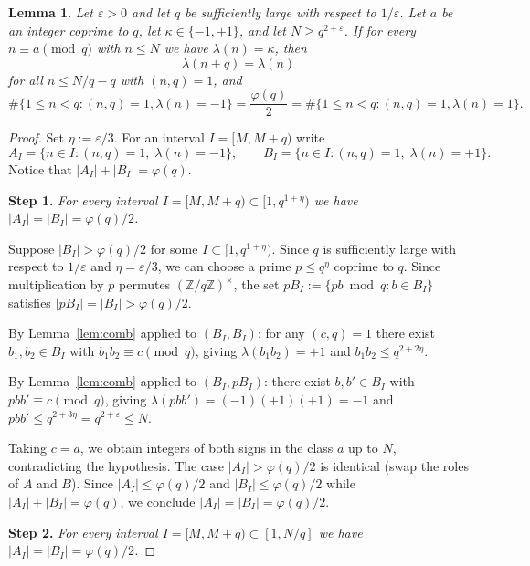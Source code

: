 \documentclass[10pt,a4paper]{amsart}
\newtheorem{lemma}{Lemma}
\begin{document}
\begin{lemma}\label{lem:periodicity}
Let $\varepsilon > 0$ and let $q$ be 
sufficiently large  with respect to $1/\varepsilon$.
Let $a$ be an integer coprime to $q$,
let $\kappa \in \{-1, +1\}$, and let $N \geq q^{2 + \varepsilon}$.
If for every $n \equiv a \pmod{q}$ with $n \leq N$ we have
$\lambda(n) = \kappa$, then
\[
\lambda(n + q) = \lambda(n)
\]
for all $n \leq N/q - q$ with $(n, q) = 1$, and
$$
\# \Big \{ 1 \leq n < q : (n,q)=1, \lambda(n) = -1 \Big \} = \frac{\varphi(q)}{2} = \# \Big \{ 1 \leq n < q : (n,q)=1, \lambda(n) = 1 \Big \}.
$$
\end{lemma}

\begin{proof}
Set $\eta := \varepsilon/3$.
For an interval $I = [M, M + q)$ write
\[
A_I = \{n \in I : (n, q) = 1,\; \lambda(n) = -1\},
\qquad
B_I = \{n \in I : (n, q) = 1,\; \lambda(n) = +1\}.
\]
Notice that $|A_I| + |B_I| = \varphi(q)$.

\medskip
\noindent\textbf{Step 1.}
\textit{For every interval $I = [M, M+q) \subset [1, q^{1+\eta})$
we have $|A_I| = |B_I| = \varphi(q)/2$.}

\smallskip
Suppose $|B_I| > \varphi(q)/2$ for some
$I \subset [1, q^{1 + \eta})$. Since $q$ is sufficiently large
with respect to $1/\varepsilon$ and $\eta = \varepsilon / 3$,
we can choose a prime $p \leq q^{\eta}$ coprime to $q$.
Since multiplication by $p$ permutes
$(\mathbb{Z}/q\mathbb{Z})^{\times}$,
the set $pB_I := \{pb \bmod q : b \in B_I\}$
satisfies $|pB_I| = |B_I| > \varphi(q)/2$.

By Lemma~\ref{lem:comb} applied to $(B_I, B_I)$:
for any $(c, q) = 1$ there exist
$b_1, b_2 \in B_I$ with $b_1 b_2 \equiv c \pmod{q}$,
giving $\lambda(b_1 b_2) = +1$ and
$b_1 b_2 \leq q^{2 + 2\eta}$.

By Lemma~\ref{lem:comb} applied to $(B_I, pB_I)$:
there exist $b, b' \in B_I$ with
$pbb' \equiv c \pmod{q}$, giving
$\lambda(pbb') = (-1)(+1)(+1) = -1$ and
$pbb' \leq q^{2 + 3\eta} = q^{2 + \varepsilon} \leq N$.

Taking $c = a$, we obtain integers of both signs in the
class $a$ up to $N$, contradicting the hypothesis.
The case $|A_I| > \varphi(q)/2$ is identical
(swap the roles of $A$ and $B$).
Since $|A_I| \leq \varphi(q)/2$ and $|B_I| \leq \varphi(q)/2$
while $|A_I| + |B_I| = \varphi(q)$,
we conclude $|A_I| = |B_I| = \varphi(q)/2$.

\medskip
\noindent\textbf{Step 2.}
\textit{For every interval $I = [M, M+q) \subset [1, N/q]$
we have $|A_I| = |B_I| = \varphi(q)/2$.}


\end{proof}
\end{document}
